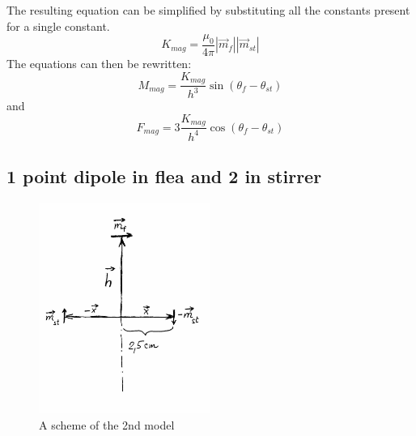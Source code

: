 \documentclass[10pt,a4paper]{article}
\begin{document}
The resulting equation can be simplified by substituting all the constants present for a single constant.
\begin{equation}
 K_{mag} = \frac{\mu_{0}}{4 \pi}{|\vec{m}_f||\vec{m}_{st}|}
 \label{definiceKmag}
 \end{equation}
The equations can then be rewritten:
\begin{equation}
M_{mag} = \frac{K_{mag}}{h^3}\sin(\theta_f - \theta_{st})
\label{magmoment2}
\end{equation}
and
\begin{equation}
F_{mag} = 3\frac{K_{mag}}{h^4}\cos(\theta_f - \theta_{st})
\label{magsila2}
\end{equation}


\subsection{1 point dipole in flea and 2 in stirrer}
\begin{figure}[H]
  \centering
  \includegraphics[width=0.5\textwidth]{Fig2a.jpg}
  \caption{A scheme of the 2nd model}
  \label{obr:2 dipoly}
\end{figure}
\end{document}
